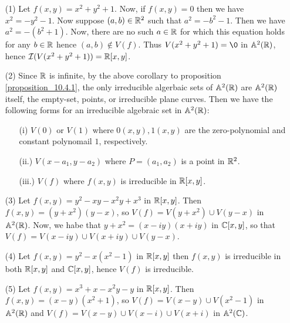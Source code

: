 \begin{example}\label{example_10.6}
  \begin{enumerate}
    \item[(1)] Let $f(x,y)=x^2+y^2+1$. Now, if $f(x,y)=0$ then we
      have $x^2=-y^2-1$. Now suppose $(a,b) \in \mathbb{R}^2$ such that
      $a^2=-b^2-1$. Then we have  $a^2=-(b^2+1)$. Now, there are no
      such $a \in \mathbb{R}$ for which this equation holds for any $b \in \mathbb{R}$
      hence $(a,b) \notin V(f)$. Thus $V(x^2+y^2+1)=\0$ in $\mathbb{A}^2(\mathbb{R})$,
      hence $\mathcal{I}(V(x^2+y^2+1))=\mathbb{R}[x,y]$.

    \item[(2)] Since $\mathbb{R}$ is infinite, by the above corollary to
      proposition \ref{proposition_10.4.1}, the only irreducible
      algerbaic sets of $\mathbb{A}^2(\mathbb{R})$ are $\mathbb{A}^2(\mathbb{R})$ itself, the
      empty-set, points, or irreducible plane curves. Then we have the
      following forms for an irreducible algebraic set in $\mathbb{A}^2(\mathbb{R})$:
      \begin{enumerate}
        \item[(i)] $V(0)$ or $V(1)$ where $0(x,y), 1(x,y)$ are the
          zero-polynomial and constant polynomail $1$, respectively.

        \item[(ii.)] $V(x-a_1,y-a_2)$ where $P=(a_1,a_2)$ is a point
          in $\mathbb{R}^2$.

        \item[(iii.)] $V(f)$ where $f(x,y)$ is irreducible in
          $\mathbb{R}[x,y]$.
      \end{enumerate}

    \item[(3)] Let $f(x,y)=y^2-xy-x^2y+x^3$ in $\mathbb{R}[x,y]$. Then
      $f(x,y)=(y+x^2)(y-x)$, so $V(f)=V(y+x^2) \cup V(y-x)$ in
      $\mathbb{A}^2(\mathbb{R})$. Now, we habe that $y+x^2=(x-iy)(x+iy)$ in $\mathbb{C}[x,y]$,
      so that $V(f)=V(x-iy) \cup V(x+iy) \cup V(y-x)$.

    \item[(4)] Let $f(x,y)=y^2-x(x^2-1)$ in $\mathbb{R}[x,y]$ then $f(x,y)$ is
      irreducible in both $\mathbb{R}[x,y]$ and $\mathbb{C}[x,y]$, hence $V(f)$ is
      irreducible.

    \item[(5)] Let $f(x,y)=x^3+x-x^2y-y$ in $\mathbb{R}[x,y]$. Then
      $f(x,y)=(x-y)(x^2+1)$, so $V(f)=V(x-y) \cup V(x^2-1)$ in
      $\mathbb{A}^2(\mathbb{R})$ and $V(f)=V(x-y) \cup V(x-i) \cup V(x+i)$ in
      $\mathbb{A}^2(\mathbb{C})$.
  \end{enumerate}
\end{example}
